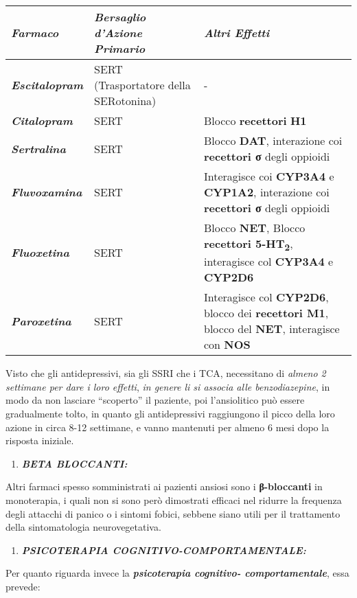 \documentclass[]{article}
\begin{document}
\begin{longtable}[]{@{}lll@{}}
\toprule
\textbf{\emph{Farmaco}} & \textbf{\emph{Bersaglio d'Azione Primario}} &
\textbf{\emph{Altri Effetti}}\tabularnewline
\midrule
\endhead
\textbf{\emph{Escitalopram}} & SERT (Trasportatore della SERotonina) &
-\tabularnewline
\textbf{\emph{Citalopram}} & SERT & Blocco \textbf{recettori}
\textbf{H1}\tabularnewline
\textbf{\emph{Sertralina}} & SERT & Blocco \textbf{DAT}, interazione coi
\textbf{recettori σ} degli oppioidi\tabularnewline
\textbf{\emph{Fluvoxamina}} & SERT & Interagisce coi \textbf{CYP3A4} e
\textbf{CYP1A2}, interazione coi \textbf{recettori σ} degli
oppioidi\tabularnewline
\textbf{\emph{Fluoxetina}} & SERT & Blocco \textbf{NET}, Blocco
\textbf{recettori 5-HT\textsubscript{2}}, interagisce col
\textbf{CYP3A4} e \textbf{CYP2D6}\tabularnewline
\textbf{\emph{Paroxetina}} & SERT & Interagisce col \textbf{CYP2D6},
blocco dei \textbf{recettori M1}, blocco del \textbf{NET}, interagisce
con \textbf{NOS}\tabularnewline
\bottomrule
\end{longtable}

Visto che gli antidepressivi, sia gli SSRI che i TCA, necessitano di
\emph{almeno 2 settimane per dare i loro effetti}, \emph{in genere li si
associa alle benzodiazepine}, in modo da non lasciare ``scoperto'' il
paziente, poi l'ansiolitico può essere gradualmente tolto, in quanto gli
antidepressivi raggiungono il picco della loro azione in circa 8-12
settimane, e vanno mantenuti per almeno 6 mesi dopo la risposta
iniziale.

\begin{enumerate}
\def\labelenumi{\arabic{enumi}.}
\item
  \textbf{\emph{BETA BLOCCANTI:}}
\end{enumerate}

Altri farmaci spesso somministrati ai pazienti ansiosi sono i
\textbf{β-bloccanti} in monoterapia, i quali non si sono però dimostrati
efficaci nel ridurre la frequenza degli attacchi di panico o i sintomi
fobici, sebbene siano utili per il trattamento della sintomatologia
neurovegetativa.

\begin{enumerate}
\def\labelenumi{\arabic{enumi}.}
\item
  \textbf{\emph{PSICOTERAPIA COGNITIVO-COMPORTAMENTALE:}}
\end{enumerate}

Per quanto riguarda invece la \textbf{\emph{psicoterapia cognitivo-
comportamentale}}, essa prevede:
\end{document}

